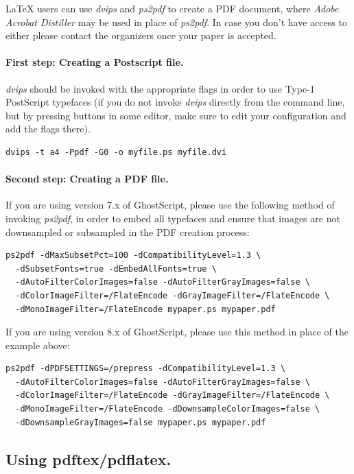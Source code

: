 \documentclass[twoside]{article}
\begin{document}
 \LaTeX{} users can use {\em dvips} and {\em ps2pdf} to create a PDF 
document, where {\em Adobe Acrobat Distiller} may be used in place of {\em 
ps2pdf}. In case you don't have access to either please contact the 
organizers once your paper is accepted.

\paragraph{First step: Creating a Postscript file.} {\em dvips} should be 
invoked with the appropriate flags in order to use Type-1 PostScript 
typefaces (if you do not invoke {\em dvips} directly from the command 
line, but by pressing buttons in some editor, make sure to edit your 
configuration and add the flags there).

{\footnotesize\begin{verbatim}
dvips -t a4 -Ppdf -G0 -o myfile.ps myfile.dvi
\end{verbatim}}

\paragraph{Second step: Creating a PDF file.} If you are using version 7.x 
of GhostScript, please use the following method of invoking {\em ps2pdf}, 
in order to embed all typefaces and ensure that images are not downsampled 
or subsampled in the PDF creation process:

{\footnotesize\begin{verbatim}
ps2pdf -dMaxSubsetPct=100 -dCompatibilityLevel=1.3 \
  -dSubsetFonts=true -dEmbedAllFonts=true \
  -dAutoFilterColorImages=false -dAutoFilterGrayImages=false \
  -dColorImageFilter=/FlateEncode -dGrayImageFilter=/FlateEncode \
  -dMonoImageFilter=/FlateEncode mypaper.ps mypaper.pdf
\end{verbatim}}


\noindent If you are using version 8.x of GhostScript, please use this 
method in place of the example above:

{\footnotesize\begin{verbatim}
ps2pdf -dPDFSETTINGS=/prepress -dCompatibilityLevel=1.3 \
  -dAutoFilterColorImages=false -dAutoFilterGrayImages=false \
  -dColorImageFilter=/FlateEncode -dGrayImageFilter=/FlateEncode \
  -dMonoImageFilter=/FlateEncode -dDownsampleColorImages=false \
  -dDownsampleGrayImages=false mypaper.ps mypaper.pdf
\end{verbatim}}


\subsection{Using pdftex/pdflatex.}
\end{document}
